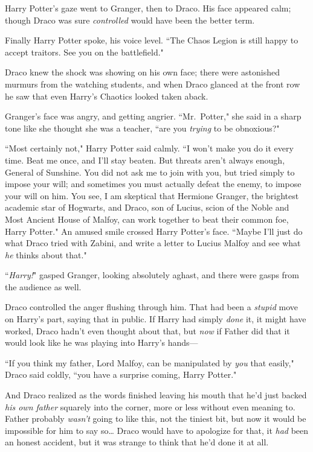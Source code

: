 Harry Potter's gaze went to Granger, then to Draco. His face appeared calm; though Draco was sure \emph{controlled} would have been the better term.

Finally Harry Potter spoke, his voice level. ``The Chaos Legion is still happy to accept traitors. See you on the battlefield."

Draco knew the shock was showing on his own face; there were astonished murmurs from the watching students, and when Draco glanced at the front row he saw that even Harry's Chaotics looked taken aback.

Granger's face was angry, and getting angrier. ``Mr.~Potter," she said in a sharp tone like she thought she was a teacher, ``are you \emph{trying} to be obnoxious?"

``Most certainly not," Harry Potter said calmly. ``I won't make you do it every time. Beat me once, and I'll stay beaten. But threats aren't always enough, General of Sunshine. You did not ask me to join with you, but tried simply to impose your will; and sometimes you must actually defeat the enemy, to impose your will on him. You see, I am skeptical that Hermione Granger, the brightest academic star of Hogwarts, and Draco, son of Lucius, scion of the Noble and Most Ancient House of Malfoy, can work together to beat their common foe, Harry Potter." An amused smile crossed Harry Potter's face. ``Maybe I'll just do what Draco tried with Zabini, and write a letter to Lucius Malfoy and see what \emph{he} thinks about that."

``\emph{Harry!}" gasped Granger, looking absolutely aghast, and there were gasps from the audience as well.

Draco controlled the anger flushing through him. That had been a \emph{stupid} move on Harry's part, saying that in public. If Harry had simply \emph{done} it, it might have worked, Draco hadn't even thought about that, but \emph{now} if Father did that it would look like he was playing into Harry's hands—

``If you think my father, Lord Malfoy, can be manipulated by \emph{you} that easily," Draco said coldly, ``you have a surprise coming, Harry Potter."

And Draco realized as the words finished leaving his mouth that he'd just backed \emph{his own father} squarely into the corner, more or less without even meaning to. Father probably \emph{wasn't} going to like this, not the tiniest bit, but now it would be impossible for him to say so{\ldots} Draco would have to apologize for that, it \emph{had} been an honest accident, but it was strange to think that he'd done it at all.

